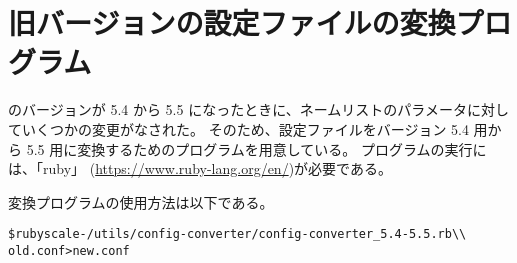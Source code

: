 \section{旧バージョンの設定ファイルの変換プログラム}

\scalelib のバージョンが 5.4 から 5.5 になったときに、ネームリストのパラメータに対していくつかの変更がなされた。
そのため、設定ファイルをバージョン 5.4 用から 5.5 用に変換するためのプログラムを用意している。
プログラムの実行には、「ruby」 (\url{https://www.ruby-lang.org/en/})が必要である。

変換プログラムの使用方法は以下である。\\
\begin{alltt}
 \$ ruby scale-{\version}/utils/config-converter/config-converter_5.4-5.5.rb \verb|\\|
        old.conf > new.conf
\end{alltt}
